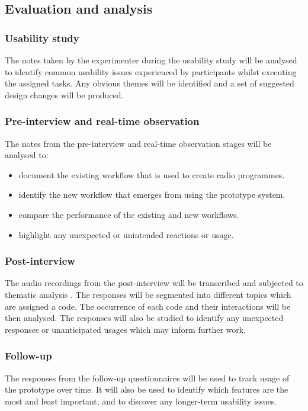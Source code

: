 \subsection{Evaluation and analysis}
\subsubsection{Usability study}
The notes taken by the experimenter during the usability study will be analysed
to identify common usability issues experienced by participants whilst
executing the assigned tasks. Any obvious themes will be identified and a set
of suggested design changes will be produced.

\subsubsection{Pre-interview and real-time observation}
The notes from the pre-interview and real-time observation stages will be
analysed to:
\begin{itemize}
\item document the existing workflow that is used to create radio programmes.
\item identify the new workflow that emerges from using the prototype system.
\item compare the performance of the existing and new workflows.
\item highlight any unexpected or unintended reactions or usage.
\end{itemize}

\subsubsection{Post-interview}
The audio recordings from the post-interview will be transcribed and subjected
to thematic analysis \citep{Braun2006}. The responses will be segmented into
different topics which are assigned a code. The occurrence of each code and
their interactions will be then analysed. The responses will also be studied to
identify any unexpected responses or unanticipated usages which may inform
further work.

\subsubsection{Follow-up}
The responses from the follow-up questionnaires will be used to track usage of
the prototype over time. It will also be used to identify which features are
the most and least important, and to discover any longer-term usability issues.

